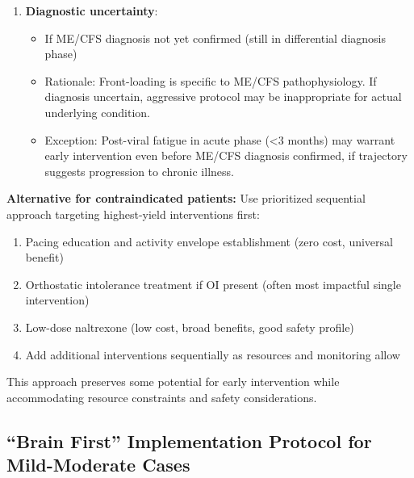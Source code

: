 \begin{warning}
\begin{enumerate}
    \item \textbf{Diagnostic uncertainty}:
    \begin{itemize}
        \item If ME/CFS diagnosis not yet confirmed (still in differential diagnosis phase)
        \item Rationale: Front-loading is specific to ME/CFS pathophysiology. If diagnosis uncertain, aggressive protocol may be inappropriate for actual underlying condition.
        \item Exception: Post-viral fatigue in acute phase (<3 months) may warrant early intervention even before ME/CFS diagnosis confirmed, if trajectory suggests progression to chronic illness.
    \end{itemize}
\end{enumerate}

\textbf{Alternative for contraindicated patients:} Use prioritized sequential approach targeting highest-yield interventions first:
\begin{enumerate}
    \item Pacing education and activity envelope establishment (zero cost, universal benefit)
    \item Orthostatic intolerance treatment if OI present (often most impactful single intervention)
    \item Low-dose naltrexone (low cost, broad benefits, good safety profile)
    \item Add additional interventions sequentially as resources and monitoring allow
\end{enumerate}

This approach preserves some potential for early intervention while accommodating resource constraints and safety considerations.
\end{warning}

\subsection{``Brain First'' Implementation Protocol for Mild-Moderate Cases}
\label{subsec:brain-first-implementation}

